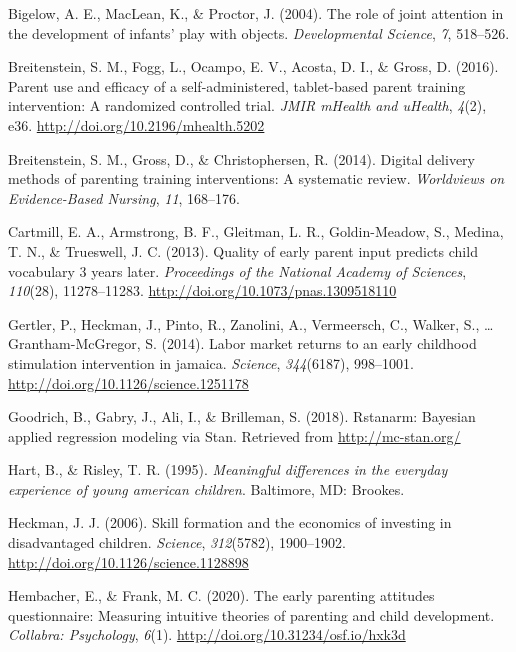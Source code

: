 \documentclass[man,floatsintext]{apa6}
\begin{document}
\leavevmode\hypertarget{ref-Bigelow2004}{}%
Bigelow, A. E., MacLean, K., \& Proctor, J. (2004). The role of joint attention in the development of infants' play with objects. \emph{Developmental Science}, \emph{7}, 518--526.

\leavevmode\hypertarget{ref-Breitenstein2016}{}%
Breitenstein, S. M., Fogg, L., Ocampo, E. V., Acosta, D. I., \& Gross, D. (2016). Parent use and efficacy of a self-administered, tablet-based parent training intervention: A randomized controlled trial. \emph{JMIR mHealth and uHealth}, \emph{4}(2), e36. \url{http://doi.org/10.2196/mhealth.5202}

\leavevmode\hypertarget{ref-Breitenstein2014}{}%
Breitenstein, S. M., Gross, D., \& Christophersen, R. (2014). Digital delivery methods of parenting training interventions: A systematic review. \emph{Worldviews on Evidence-Based Nursing}, \emph{11}, 168--176.

\leavevmode\hypertarget{ref-Cartmill2013}{}%
Cartmill, E. A., Armstrong, B. F., Gleitman, L. R., Goldin-Meadow, S., Medina, T. N., \& Trueswell, J. C. (2013). Quality of early parent input predicts child vocabulary 3 years later. \emph{Proceedings of the National Academy of Sciences}, \emph{110}(28), 11278--11283. \url{http://doi.org/10.1073/pnas.1309518110}

\leavevmode\hypertarget{ref-Jamaica2014}{}%
Gertler, P., Heckman, J., Pinto, R., Zanolini, A., Vermeersch, C., Walker, S., \ldots{} Grantham-McGregor, S. (2014). Labor market returns to an early childhood stimulation intervention in jamaica. \emph{Science}, \emph{344}(6187), 998--1001. \url{http://doi.org/10.1126/science.1251178}

\leavevmode\hypertarget{ref-rstanarm}{}%
Goodrich, B., Gabry, J., Ali, I., \& Brilleman, S. (2018). Rstanarm: Bayesian applied regression modeling via Stan. Retrieved from \url{http://mc-stan.org/}

\leavevmode\hypertarget{ref-Hart1995}{}%
Hart, B., \& Risley, T. R. (1995). \emph{Meaningful differences in the everyday experience of young american children}. Baltimore, MD: Brookes.

\leavevmode\hypertarget{ref-Heckman2006}{}%
Heckman, J. J. (2006). Skill formation and the economics of investing in disadvantaged children. \emph{Science}, \emph{312}(5782), 1900--1902. \url{http://doi.org/10.1126/science.1128898}

\leavevmode\hypertarget{ref-Hembacher2020}{}%
Hembacher, E., \& Frank, M. C. (2020). The early parenting attitudes questionnaire: Measuring intuitive theories of parenting and child development. \emph{Collabra: Psychology}, \emph{6}(1). \url{http://doi.org/10.31234/osf.io/hxk3d}
\end{document}
